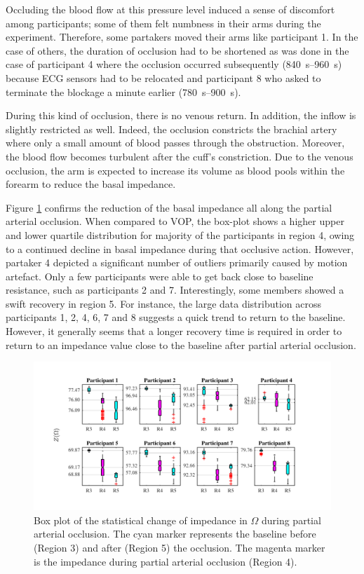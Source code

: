 Occluding the blood flow at this pressure level induced a sense of discomfort among participants; some of them felt numbness in their arms during the experiment. Therefore, some partakers moved their arms like participant 1. In the case of others, the duration of occlusion had to be shortened as was done in the case of participant 4 where the occlusion occurred subsequently (\SIrange{840}{960}{\second}) because ECG sensors had to be relocated and participant 8 who asked to terminate the blockage a minute earlier (\SIrange{780}{900}{\second}). 

During this kind of occlusion, there is no venous return. In addition, the inflow is slightly restricted as well. Indeed, the occlusion constricts the brachial artery where only a small amount of blood passes through the obstruction. Moreover, the blood flow becomes turbulent after the cuff's constriction.  Due to the venous occlusion, the arm is expected to increase its volume as blood pools within the forearm to reduce the basal impedance. 

Figure \ref{fig:partial arterial statistics impedance} confirms the reduction of the basal impedance all along the partial arterial occlusion. When compared to VOP, the box-plot shows a higher upper and lower quartile distribution for majority of the participants in region 4, owing to a continued decline in basal impedance during that occlusive action. However, partaker 4 depicted a significant number of outliers primarily caused by motion artefact. Only a few participants were able to get back close to baseline resistance, such as participants 2 and 7. Interestingly, some members showed a swift recovery in region 5. For instance, the large data distribution across participants 1, 2, 4, 6, 7 and 8 suggests a quick trend to return to the baseline. However, it generally seems that a longer recovery time is required in order to return to an impedance value close to the baseline after partial arterial occlusion. 

\begin{figure}[htbp]
	\centering
	\includegraphics[width=15cm,keepaspectratio]{figure_vop_4}    
	\caption[Change of impedance during partial arterial occlusion]{Box plot of the statistical change of impedance in $\Omega$ during partial arterial occlusion. The cyan marker represents the baseline before (Region 3) and after (Region 5) the occlusion. The magenta marker is the impedance during partial arterial occlusion (Region 4).}
	\label{fig:partial arterial statistics impedance}
\end{figure}  

